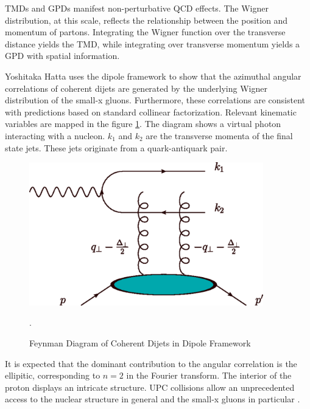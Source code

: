TMDs and GPDs manifest non-perturbative QCD effects. The Wigner distribution, at this scale, reflects the relationship between the position and momentum of partons. Integrating the Wigner function over the transverse distance yields the TMD, while integrating over transverse momentum yields a GPD with spatial information. 

Yoshitaka Hatta uses the dipole framework to show that the azimuthal angular correlations of coherent dijets are generated by the underlying Wigner distribution of the small-x gluons. Furthermore, these correlations are consistent with predictions based on standard collinear factorization. Relevant kinematic variables are mapped in the figure \ref{fig:yatta1}. The diagram shows a virtual photon interacting with a nucleon. $k_1$ and $k_2$ are the transverse momenta of the final state jets. These jets originate from a quark-antiquark pair. 

\begin{figure}[h!]
\begin{centering}
\includegraphics[width=4in]{Chapter1/importfigs/fig4_yatta.png}
\par\end{centering}
\caption{Feynman Diagram of Coherent Dijets in Dipole Framework \cite{Hatta:2016dxp}\label{fig:yatta1}}.
\end{figure}

It is expected that the dominant contribution to the angular correlation is the ellipitic, corresponding to $n=2$ in the Fourier transform. The interior of the proton displays an intricate structure. UPC collisions allow an unprecedented access to the nuclear structure in general and the small-x gluons in particular \cite{Altinoluk:2015dpi}. 